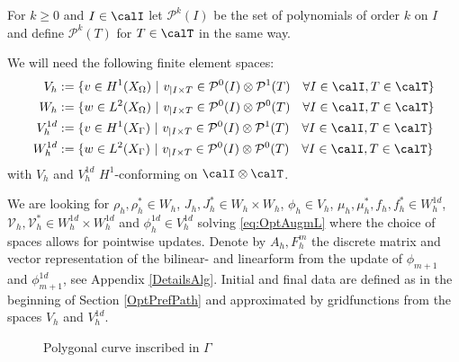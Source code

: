 \documentclass{article}
\def\calP{{\mathcal P}} \def\calQ{{\mathcal Q}} \def\calR{{\mathcal R}}
\begin{document}
For $k\geq 0$ and $I\in\calI$ let $\calP^k(I)$ be the set of polynomials of order $k$ on $I$ and define $\calP^k(T)$ for $T\in\calT$ in the same way.

We will need the following finite element spaces:
\begin{align*}
    V_h &:= \{ v \in H^1(X_\Omega) \ | \ v_{|I\times T} \in \calP^0(I)\otimes\calP^1(T) \quad\forall I\in\calI, T\in\calT\}\\
    W_h &:= \{ w \in L^2(X_\Omega) \ | \ v_{|I\times T} \in \calP^0(I)\otimes\calP^0(T) \quad\forall I\in\calI, T\in\calT\}\\
    V_h^{1d} &:= \{ v \in H^1(X_\Gamma) \ | \ v_{|I\times T} \in \calP^0(I)\otimes\calP^1(T) \quad\forall I\in\calI, T\in\calT\}\\
    W_h^{1d} &:= \{ w \in L^2(X_\Gamma) \ | \ v_{|I\times T} \in \calP^0(I)\otimes\calP^0(T) \quad\forall I\in\calI, T\in\calT\}    
\end{align*}
with $V_h$ and $V_h^{1d}$ $H^1$-conforming on $\calI\otimes\calT$.

We are looking for $\rho_h, \rho^*_h\in W_h$, $J_h, J_h^*\in W_h\times W_h$, $\phi_h\in V_h$, $\mu_h, \mu_h^*, f_h, f_h^*\in W_h^{1d}$, $\mathcal{V}_h, \mathcal{V}^*_h \in W_h^{1d}\times W_h^{1d}$ and $\phi^{1d}_h\in V_h^{1d}$ solving \eqref{eq:OptAugmL} where the choice of spaces allows for pointwise updates. Denote by $A_h, F^m_h$ the discrete matrix and vector representation of the bilinear- and linearform from the update of $\phi_{m+1}$ and $\phi^{1d}_{m+1}$, see Appendix \ref{DetailsAlg}. 
Initial and final data are defined as in the beginning of Section \ref{OptPrefPath} and approximated by gridfunctions from the spaces $V_h$ and $V_h^{1d}$.

\begin{figure}
    \centering
    \caption{Polygonal curve inscribed in $\Gamma$}
    \label{fig:polgyon}
\end{figure}
\end{document}
